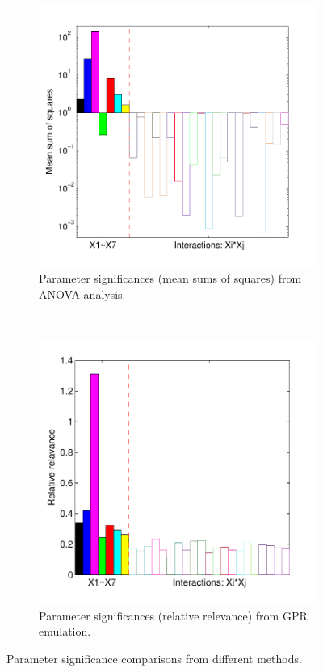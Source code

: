 \documentclass[review]{elsarticle}
\begin{document}
\begin{figure}[ht!]
\begin{subfigure}{0.5\textwidth}
\centering
\hspace*{-2.3cm}\includegraphics[width=1.4\linewidth]{NSE15-48R1_Figure10a.pdf}
\caption{Parameter significances (mean sums of squares) from ANOVA analysis.}
\label{fg:anova_sig}
\end{subfigure}
~
\begin{subfigure}{0.5\textwidth}
\centering
\includegraphics[width=1.4\linewidth]{NSE15-48R1_Figure10b.pdf}
\caption{Parameter significances (relative relevance) from GPR emulation.}
\label{fg:gpr_sig}
\end{subfigure}
\caption{Parameter significance comparisons from different methods.}
\label{fg:sigs}
\end{figure}
\end{document}
